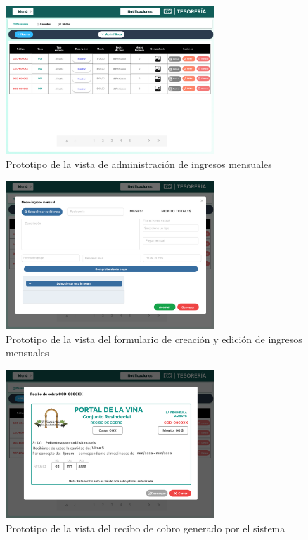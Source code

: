 \begin{figure}[H]
    \centering
    \includegraphics[width=0.7\textwidth]{resources/images/tesoreia - ingresos - mensuales}
    \caption{Prototipo de la vista de administración de ingresos mensuales}
    \label{fig:tesoreria-ingresos-mensuales}
\end{figure}

\begin{figure}[H]
    \centering
    \includegraphics[width=0.7\textwidth]{resources/images/tesoreia - ingresos - mensuales - edit}
    \caption{Prototipo de la vista del formulario de creación y edición de ingresos mensuales}
    \label{fig:tesoreria-ingresos-mensuales-formulario}
\end{figure}

\begin{figure}[H]
    \centering
    \includegraphics[width=0.7\textwidth]{resources/images/tesoreia-ingresos-mensuales-recibo}
    \caption{Prototipo de la vista del recibo de cobro generado por el sistema}
    \label{fig:tesoreria-ingresos-mensuales-recibo}
\end{figure}

